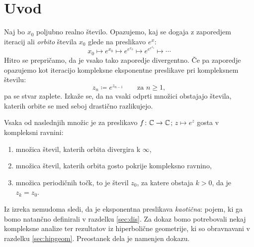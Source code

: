 \section{Uvod} \label{sec:intro}

Naj bo \(x_0\) poljubno realno število. Opazujemo, kaj se dogaja z zaporedjem iteracij ali \emph{orbito} števila \(x_0\) glede na preslikavo \(e^{x}\):
\[x_0 \mapsto e^{x_0} \mapsto e^{e^{x_0}} \mapsto e^{e^{e^{x_0}}} \mapsto \cdots\]
Hitro se prepričamo, da je vsako tako zaporedje divergentno. Če pa zaporedje opazujemo kot iteracijo kompleksne eksponentne preslikave pri kompleksnem številu:
\[z_n \coloneqq e^{z_{n - 1}} \qquad \text{za } n \geq 1,\]
pa se stvar zaplete. Izkaže se, da na vsaki odprti množici obstajajo števila, katerih orbite se med seboj drastično razlikujejo.

\begin{izrek} \label{thm:orbits}
    Vsaka od naslednjih množic je za preslikavo \(f \colon \mathbb C \to \mathbb C\); \(z \mapsto e^{z}\) gosta v kompleksni ravnini:
    \begin{enumerate}
        \item množica števil, katerih orbita divergira k \(\infty\),
        \item množica števil, katerih orbita gosto pokrije kompleksno ravnino,
        \item množica periodičnih točk, to je števil \(z_0\), za katere obstaja
            \(k > 0\), da je \(z_k = z_0\).
    \end{enumerate}
\end{izrek}

\noindent Iz izreka nemudoma sledi, da je eksponentna preslikava \emph{kaotična}: pojem, ki ga bomo natančno definirali v razdelku \ref{sec:dis}. Za dokaz bomo potrebovali nekaj kompleksne analize ter rezultatov iz hiperbolične geometrije, ki so obravnavani v razdelku \ref{sec:hipgeom}. Preostanek dela je namenjen dokazu.